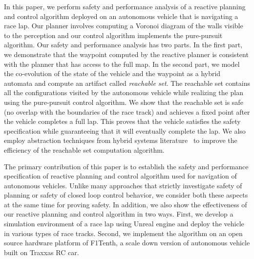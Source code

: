 In this paper, we perform safety and performance analysis of a reactive planning and control algorithm deployed on an autonomous vehicle that is navigating a race lap.
%
Our planner involves computing a Voronoi diagram of the walls visible to the perception and our control algorithm implements the pure-pursuit algorithm.
%
Our safety and performance analysis has two parts.
%
In the first part, we demonstrate that the waypoint computed by the reactive planner is consistent with the planner that has access to the full map.
%
In the second part, we model the co-evolution of the state of the vehicle and the waypoint as a hybrid automata and compute an artifact called \emph{reachable set}.
%
The reachable set contains all the configurations visited by the autonomous vehicle while realizing the plan using the pure-pursuit control algorithm.
%
We show that the reachable set is safe (no overlap with the boundaries of the race track) and achieves a fixed point after the vehicle completes a full lap.
%
This proves that the vehicle satisfies the safety specification while guaranteeing that it will eventually complete the lap.
%
We also employ abstraction techniques from hybrid systems literature~\cite{tiwari2002series,prabhakar2015hybrid} to improve the efficiency of the reachable set computation algorithm.


The primary contribution of this paper is to establish the safety and performance specification of reactive planning and control algorithm used for navigation of autonomous vehicles.
%
Unlike many approaches that strictly investigate safety of planning or safety of closed loop control behavior, we consider both these aspects at the same time for proving safety.
%
In addition, we also show the effectiveness of our reactive planning and control algorithm in two ways.
%
First, we develop a simulation environment of a race lap using Unreal engine and deploy the vehicle in various types of race tracks.
%
Second, we implement the algorithm on an open source hardware platform of F1Tenth, a scale down version of autonomous vehicle built on Traxxas RC car.
